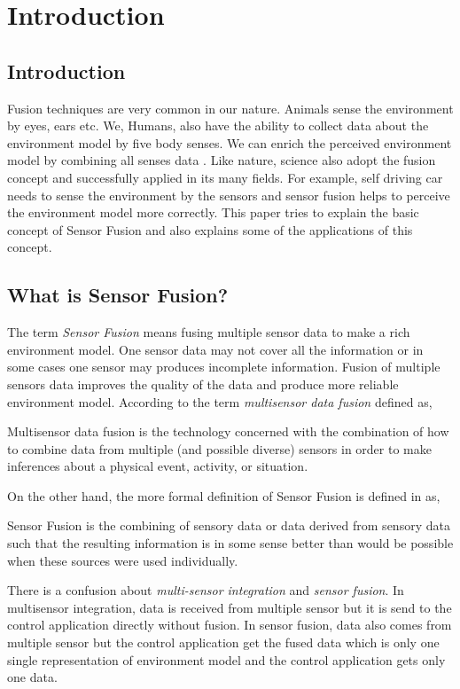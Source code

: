 \chapter{Introduction}

\section{Introduction}
Fusion techniques are very common in our nature. Animals sense the environment by eyes, ears etc. We, Humans, also have the ability to collect data about the environment model by five body senses. We can enrich the perceived environment model by combining all senses data \cite{Wilfried2002}. Like nature, science also adopt the fusion concept and successfully applied in its many fields. For example, self driving car needs to sense the environment by the sensors and sensor fusion helps to perceive the environment model more correctly. This paper tries to explain the basic concept of Sensor Fusion and also explains some of the applications of this concept.

\section{What is Sensor Fusion?}
The term \emph{Sensor Fusion} means fusing multiple sensor data to make a rich environment model. One sensor data may not cover all the information or in some cases one sensor may produces incomplete information. Fusion of multiple sensors data improves the quality of the data and produce more reliable environment model. According to \cite{Hall:2004:MTM:1204261} the term \emph{multisensor data fusion} defined as,
\theoremstyle{definition}
\begin{definition}{Multisensor data fusion}
is the technology concerned with the combination of how to combine data from multiple (and possible diverse) sensors in order to make inferences about a physical event, activity, or situation.
\end{definition}
On the other hand, the more formal definition of Sensor Fusion is defined in \cite{Wilfried2002} as,
\theoremstyle{definition}
\begin{definition}{Sensor Fusion}
is the combining of sensory data or data derived from sensory data such that the resulting information is in some sense better than would be possible when these sources were used individually.
\end{definition}
There is a confusion about \emph{multi-sensor integration} and \emph{sensor fusion}. In multisensor integration, data is received from multiple sensor but it is send to the control application directly without fusion. In sensor fusion, data also comes from multiple sensor but the control application get the fused data which is only one single representation of environment model and the control application gets only one data.

